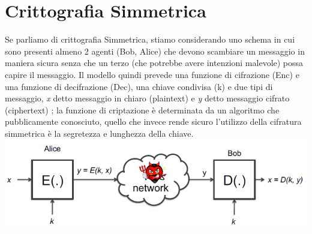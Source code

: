 \documentclass{article}
\begin{document}
  \tableofcontents

    
  \section{Crittografia Simmetrica}
    Se parliamo di crittografia Simmetrica, stiamo considerando uno schema in cui sono presenti almeno 2 agenti (Bob, Alice) che devono scambiare un messaggio in maniera sicura senza che un terzo (che potrebbe avere intenzioni malevole) possa capire il messaggio. 
    Il modello quindi prevede una funzione di cifrazione (Enc) e una funzione di decifrazione (Dec), una chiave condivisa (k) e due tipi di messaggio, \textit{x} detto messaggio in chiaro (plaintext) e \textit{y} detto messaggio cifrato (ciphertext) ; la funzione di criptazione è determinata da un algoritmo che pubblicamente conosciuto, quello che invece rende sicuro l'utilizzo della cifratura simmetrica è la segretezza e lunghezza della chiave. 
    \includegraphics{./immagini/modello.png} 
    
\end{document}
